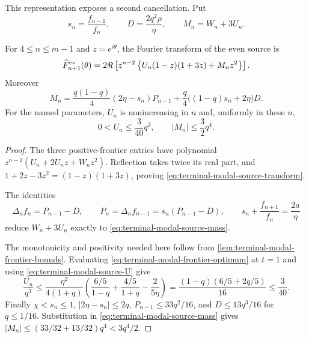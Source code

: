 This representation exposes a second cancellation.  Put
\begin{equation}
 s_n=\frac{f_{n-1}}{f_n},\qquad
 D=\frac{2q^2\rho}{\eta},\qquad M_n=W_n+3U_n.
 \label{eq:terminal-modal-source-mass-parameters}
\end{equation}

\begin{lemma}
\label{lem:terminal-modal-source-transform}
For $4\le n\le m-1$ and $z=e^{i\theta}$, the Fourier transform of the even
source is
\begin{equation}
 \widehat F_{n+1}^{\rm ev}(\theta)
 =2\Re\left[z^{n-2}
 \left\{U_n(1-z)(1+3z)+M_nz^2\right\}\right].
 \label{eq:terminal-modal-source-transform}
\end{equation}
Moreover
\begin{equation}
 M_n=\frac{q(1-q)}4(2\eta-s_n)P_{n-1}
 +\frac q4\bigl((1-q)s_n+2\eta\bigr)D.
 \label{eq:terminal-modal-source-mass}
\end{equation}
For the named parameters, $U_n$ is nonincreasing in $n$ and, uniformly in
these $n$,
\begin{equation}
 0<U_n\le\frac{3}{40}q^3,\qquad
 |M_n|\le\frac32q^4.
 \label{eq:terminal-modal-source-bounds}
\end{equation}
\end{lemma}

\begin{proof}
The three positive-frontier entries have polynomial
$z^{n-2}(U_n+2U_nz+W_nz^2)$.  Reflection takes twice its real part, and
$1+2z-3z^2=(1-z)(1+3z)$, proving
\eqref{eq:terminal-modal-source-transform}.

The identities
\[
 \Delta_nf_n=P_{n-1}-D,\qquad
 P_n=\Delta_nf_{n-1}=s_n(P_{n-1}-D),\qquad
 s_n+\frac{f_{n+1}}{f_n}=\frac{2a}{\eta}
\]
reduce $W_n+3U_n$ exactly to
\eqref{eq:terminal-modal-source-mass}.

The monotonicity and positivity needed here follow from
\cref{lem:terminal-modal-frontier-bounds}.  Evaluating
\eqref{eq:terminal-modal-frontier-optimum} at $t=1$ and using
\eqref{eq:terminal-modal-source-U} give
\[
 \frac{U_n}{q^3}
 \le\frac{\eta^2}{4(1+q)}
 \left(\frac{6/5}{1-q}+\frac{4/5}{1+q}-\frac{2}{5\eta}\right)
 =\frac{(1-q)(6/5+2q/5)}{16}\le\frac3{40}.
\]
Finally $\chi<s_n\le1$,
$|2\eta-s_n|\le2q$, $P_{n-1}\le33q^2/16$, and
$D\le13q^3/16$ for $q\le1/16$.  Substitution in
\eqref{eq:terminal-modal-source-mass} gives
$|M_n|\le(33/32+13/32)q^4<3q^4/2$.
\end{proof}

